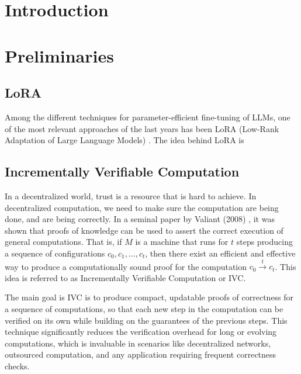 \documentclass{article}
\begin{document}
\section{Introduction}



\section{Preliminaries}


\subsection{LoRA}
Among the different techniques for parameter-efficient fine-tuning of LLMs, one of the most relevant approaches of the last years has been LoRA (Low-Rank Adaptation of Large Language Models) \cite{hu2022lora}. The idea behind LoRA is 

\subsection{Incrementally Verifiable Computation}
In a decentralized world, trust is a resource that is hard to achieve. In decentralized computation, we need to make sure the computation are being done, and are being correctly. In a seminal paper by Valiant (2008) \cite{valiant2008incrementally}, it was shown that proofs of knowledge can be used to assert the correct execution of general computations. That is, if $M$ is a machine that runs for $t$ steps producing a sequence of configurations $c_0,c_1,\dots,c_t$, then there exist an efficient and effective way to produce a computationally sound proof for the computation $c_0  \xrightarrow{t} c_t$. This idea is referred to as Incrementally Verifiable Computation or IVC.

The main goal is IVC is to produce compact, updatable proofs of correctness for a sequence of computations, so that each new step in the computation can be verified on its own while building on the guarantees of the previous steps. This technique significantly reduces the verification overhead for long or evolving computations, which is invaluable in scenarios like decentralized networks, outsourced computation, and any application requiring frequent correctness checks.
\end{document}
